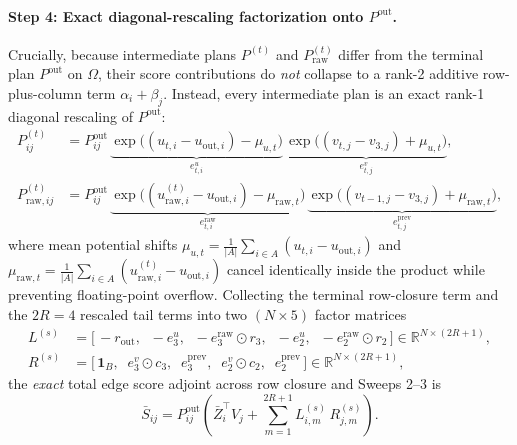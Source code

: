 \documentclass[11pt]{article}
\newcommand{\one}{\mathbf{1}}
\begin{document}
\paragraph{Step 4: Exact diagonal-rescaling factorization onto $P^{\text{out}}$.}
Crucially, because intermediate plans $P^{(t)}$ and $P^{(t)}_{\text{raw}}$ differ from the terminal plan $P^{\text{out}}$ on $\Omega$, their score contributions do \emph{not} collapse to a rank-2 additive row-plus-column term $\alpha_i + \beta_j$. Instead, every intermediate plan is an exact rank-1 diagonal rescaling of $P^{\text{out}}$:
\begin{align}
  P^{(t)}_{ij} &= P^{\text{out}}_{ij}\, \underbrace{\exp\!\big((u_{t,i} - u_{\text{out},i}) - \mu_{u,t}\big)}_{e^u_{t,i}} \, \underbrace{\exp\!\big((v_{t,j} - v_{3,j}) + \mu_{u,t}\big)}_{e^v_{t,j}}, \nonumber\\
  P^{(t)}_{\text{raw},ij} &= P^{\text{out}}_{ij}\, \underbrace{\exp\!\big((u^{(t)}_{\text{raw},i} - u_{\text{out},i}) - \mu_{\text{raw},t}\big)}_{e^{\text{raw}}_{t,i}} \, \underbrace{\exp\!\big((v_{t-1,j} - v_{3,j}) + \mu_{\text{raw},t}\big)}_{e^{\text{prev}}_{t,j}},
  \label{eq:app-orbit-rescale}
\end{align}
where mean potential shifts $\mu_{u,t} = \frac{1}{|A|}\sum_{i\in A}(u_{t,i} - u_{\text{out},i})$ and $\mu_{\text{raw},t} = \frac{1}{|A|}\sum_{i\in A}(u^{(t)}_{\text{raw},i} - u_{\text{out},i})$ cancel identically inside the product while preventing floating-point overflow. Collecting the terminal row-closure term and the $2R = 4$ rescaled tail terms into two $(N \times 5)$ factor matrices
\begin{align}
  L^{(s)} &= \big[\, -r_{\text{out}},\;\; -e^u_3,\;\; -e^{\text{raw}}_3 \odot r_3,\;\; -e^u_2,\;\; -e^{\text{raw}}_2 \odot r_2 \,\big] \in \mathbb{R}^{N \times (2R+1)}, \nonumber\\
  R^{(s)} &= \big[\, \one_B,\;\; e^v_3 \odot c_3,\;\; e^{\text{prev}}_3,\;\; e^v_2 \odot c_2,\;\; e^{\text{prev}}_2 \,\big] \in \mathbb{R}^{N \times (2R+1)},
  \label{eq:app-ls-rs}
\end{align}
the \emph{exact} total edge score adjoint across row closure and Sweeps 2--3 is
\begin{equation}
  \bar{S}_{ij} = P^{\text{out}}_{ij} \left( \bar{Z}_i^\top V_j + \sum_{m=1}^{2R+1} L^{(s)}_{i,m}\, R^{(s)}_{j,m} \right).
  \label{eq:app-exact-sbar}
\end{equation}
\end{document}
